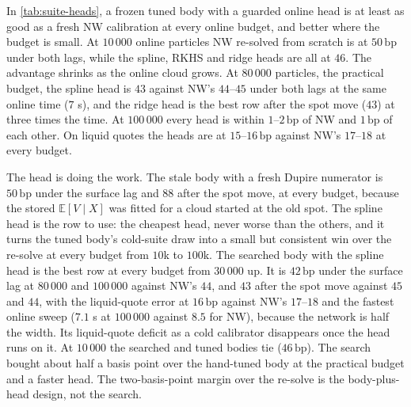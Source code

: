 \documentclass[11pt,a4paper]{article}
\newcommand{\E}{\mathbb{E}}
\newcommand{\bp}{\,\mathrm{bp}}
\begin{document}
\begin{table}[h]\centering\footnotesize
\caption{Frozen tuned or searched body ($500\,000$ particles) with an online head, against NW re-solved from scratch, by online particle budget: pooled MAE in vol bp over $20$ SSVI scenarios, two online seeds and both lags, liquid MAE at $100\,000$, and median online seconds at $10\,000$ and $100\,000$ particles. Bold: the best method row in each column; the PDE floor is the reference and is not a contender, and a zero online time (no online work) does not count.}\label{tab:suite-heads}
\resizebox{\textwidth}{!}{}
\end{table}

In \cref{tab:suite-heads}, a frozen tuned body with a guarded online head is at least as good as a fresh NW calibration at every online budget, and better where the budget is small. At $10\,000$ online particles NW re-solved from scratch is at $50\bp$ under both lags, while the spline, RKHS and ridge heads are all at $46$. The advantage shrinks as the online cloud grows. At $80\,000$ particles, the practical budget, the spline head is $43$ against NW's $44$--$45$ under both lags at the same online time ($7$ s), and the ridge head is the best row after the spot move ($43$) at three times the time. At $100\,000$ every head is within $1$--$2\bp$ of NW and $1\bp$ of each other. On liquid quotes the heads are at $15$--$16\bp$ against NW's $17$--$18$ at every budget.

The head is doing the work. The stale body with a fresh Dupire numerator is $50\bp$ under the surface lag and $88$ after the spot move, at every budget, because the stored $\E[V\mid X]$ was fitted for a cloud started at the old spot. The spline head is the row to use: the cheapest head, never worse than the others, and it turns the tuned body's cold-suite draw into a small but consistent win over the re-solve at every budget from $10$k to $100$k. The searched body with the spline head is the best row at every budget from $30\,000$ up. It is $42\bp$ under the surface lag at $80\,000$ and $100\,000$ against NW's $44$, and $43$ after the spot move against $45$ and $44$, with the liquid-quote error at $16\bp$ against NW's $17$--$18$ and the fastest online sweep ($7.1$ s at $100\,000$ against $8.5$ for NW), because the network is half the width. Its liquid-quote deficit as a cold calibrator disappears once the head runs on it. At $10\,000$ the searched and tuned bodies tie ($46\bp$). The search bought about half a basis point over the hand-tuned body at the practical budget and a faster head. The two-basis-point margin over the re-solve is the body-plus-head design, not the search.
\end{document}
